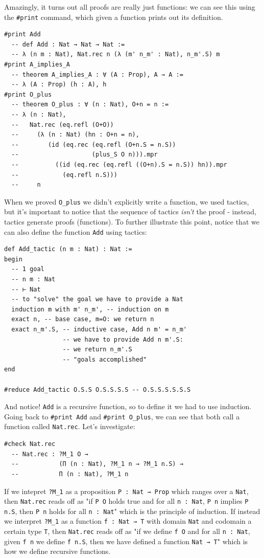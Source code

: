 \documentclass{book}
\theoremstyle{definition}
\theoremstyle{remark}
\theoremstyle{plain}
\begin{document}
Amazingly, it turns out all proofs are really just functions: we can see this using the \lstinline{#print} command,
which given a function prints out its definition.
\begin{lstlisting}
#print Add
  -- def Add : Nat → Nat → Nat :=
  -- λ (n m : Nat), Nat.rec n (λ (m' n_m' : Nat), n_m'.S) m
#print A_implies_A
  -- theorem A_implies_A : ∀ (A : Prop), A → A :=
  -- λ (A : Prop) (h : A), h
#print O_plus
  -- theorem O_plus : ∀ (n : Nat), O+n = n :=
  -- λ (n : Nat),
  --   Nat.rec (eq.refl (O+O))
  --     (λ (n : Nat) (hn : O+n = n),
  --        (id (eq.rec (eq.refl (O+n.S = n.S))
  --                    (plus_S O n))).mpr
  --          ((id (eq.rec (eq.refl ((O+n).S = n.S)) hn)).mpr
  --            (eq.refl n.S)))
  --     n
\end{lstlisting}
When we proved \lstinline{O_plus} we didn't explicitly write a function,
we used tactics, but it's important to notice that the sequence of tactics \textit{isn't} the proof -
instead, tactics generate proofs (functions).
To further illustrate this point, notice that we can also define the function \lstinline{Add} using tactics:
\begin{lstlisting}
def Add_tactic (n m : Nat) : Nat :=
begin
  -- 1 goal
  -- n m : Nat
  -- ⊢ Nat
  -- to "solve" the goal we have to provide a Nat
  induction m with m' n_m', -- induction on m
  exact n, -- base case, m=O: we return n
  exact n_m'.S, -- inductive case, Add n m' = n_m'
                -- we have to provide Add n m'.S:
                -- we return n_m'.S
                -- "goals accomplished"
end

#reduce Add_tactic O.S.S O.S.S.S.S -- O.S.S.S.S.S.S
\end{lstlisting}
And notice! \lstinline{Add} is a recursive function, so to define it we had to use induction.
Going back to \lstinline{#print Add} and \lstinline{#print O_plus},
we can see that both call a function called \lstinline{Nat.rec}. Let's investigate:
\begin{lstlisting}
#check Nat.rec
  -- Nat.rec : ?M_1 O →
  --           (Π (n : Nat), ?M_1 n → ?M_1 n.S) →
  --           Π (n : Nat), ?M_1 n
\end{lstlisting}
If we intepret \lstinline{?M_1} as a proposition \lstinline{P : Nat → Prop} which ranges over a \lstinline{Nat},
then \lstinline{Nat.rec} reads off as
"if \lstinline{P O} holds true and for all \lstinline{n : Nat},
\lstinline{P n} implies \lstinline{P n.S}, then \lstinline{P n} holds for all \lstinline{n : Nat}" which is the principle of induction.
If instead we interpret \lstinline{?M_1} as a function \lstinline{f : Nat → T} with domain \lstinline{Nat} and codomain a certain type \lstinline{T},
then \lstinline{Nat.rec} reads off as
"if we define \lstinline{f O} and for all \lstinline{n : Nat},
given \lstinline{f n} we define \lstinline{f n.S}, then we have defined a function \lstinline{Nat → T}" which is how we define recursive functions.
\end{document}
